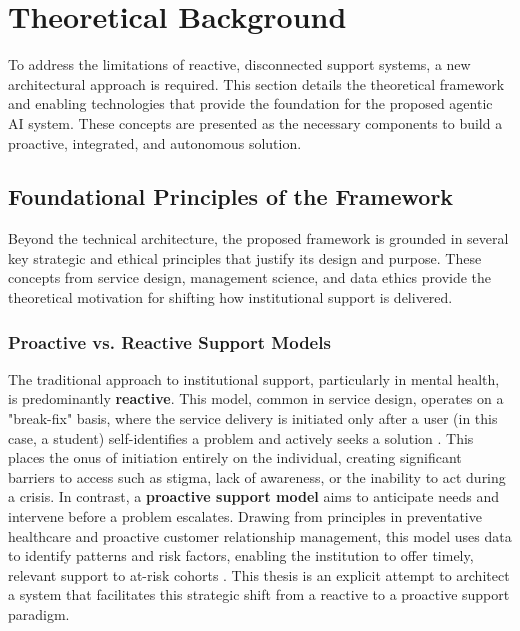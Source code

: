 \section{Theoretical Background}
\label{sec:theoretical_background}

To address the limitations of reactive, disconnected support systems, a new architectural approach is required. This section details the theoretical framework and enabling technologies that provide the foundation for the proposed agentic AI system. These concepts are presented as the necessary components to build a proactive, integrated, and autonomous solution.

\subsection{Foundational Principles of the Framework}
\label{subsec:foundational_principles}

Beyond the technical architecture, the proposed framework is grounded in several key strategic and ethical principles that justify its design and purpose. These concepts from service design, management science, and data ethics provide the theoretical motivation for shifting how institutional support is delivered.

\subsubsection{Proactive vs. Reactive Support Models}
The traditional approach to institutional support, particularly in mental health, is predominantly \textbf{reactive}. This model, common in service design, operates on a "break-fix" basis, where the service delivery is initiated only after a user (in this case, a student) self-identifies a problem and actively seeks a solution \cite{freeman2025competitionalgorithms}. This places the onus of initiation entirely on the individual, creating significant barriers to access such as stigma, lack of awareness, or the inability to act during a crisis. In contrast, a \textbf{proactive support model} aims to anticipate needs and intervene before a problem escalates. Drawing from principles in preventative healthcare and proactive customer relationship management, this model uses data to identify patterns and risk factors, enabling the institution to offer timely, relevant support to at-risk cohorts \cite{williams2022datadrivenhe, lyon2020datadrivenuniversity}. This thesis is an explicit attempt to architect a system that facilitates this strategic shift from a reactive to a proactive support paradigm.

